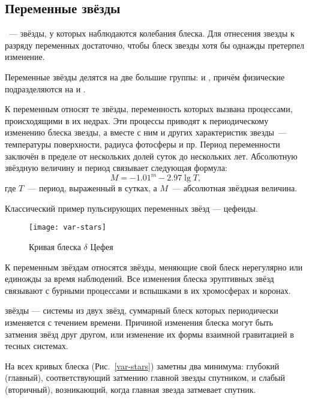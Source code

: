 \subsection{Переменные звёзды}
~--- звёзды, у которых наблюдаются колебания блеска.   Для отнесения звезды к разряду переменных достаточно, чтобы блеск звезды хотя бы однажды претерпел изменение.

Переменные звёзды делятся на две большие группы:  и , причём физические подразделяются на  и .

К  переменным  относят те звёзды, переменность которых вызвана процессами, происходящими в их недрах. Эти процессы приводят к периодическому изменению блеска звезды, а вместе с ним и других характеристик звезды~--- температуры поверхности, радиуса фотосферы и пр. Период переменности заключён в пределе от нескольких долей суток до нескольких лет. Абсолютную звёздную величину  и период связывает следующая формула:
\begin{equation}
	M = -1.01^m - 2.97\lg T,
\end{equation}
где $T$~--- период, выраженный в сутках, а $M$~--- абсолютная звёздная величина.

Классический пример пульсирующих переменных звёзд --- цефеиды.

\begin{figure}[h!]
\begin{center}
\texttt{[image: var-stars]}
\caption{Кривая блеска $\delta$ Цефея}
\end{center}
\end{figure}

К  переменным звёздам относятся звёзды, меняющие свой блеск нерегулярно или единожды за время наблюдений. Все изменения блеска эруптивных звёзд связывают с бурными процессами и вспышками в их хромосферах и коронах.

 звёзды --- системы из двух звёзд, суммарный блеск которых периодически изменяется с течением времени. Причиной изменения блеска могут быть затмения звёзд друг другом, или изменение их формы взаимной гравитацией в тесных системах.

На всех кривых блеска (Рис.~\ref{var-stars}) заметны два минимума: глубокий (главный), соответствующий затмению главной звезды спутником, и слабый (вторичный), возникающий, когда главная звезда затмевает спутник.


